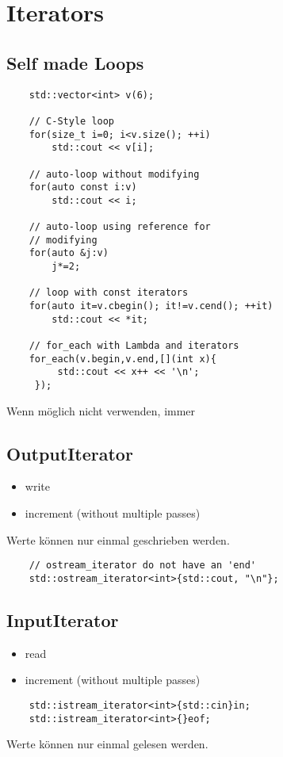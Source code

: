 \section{Iterators}
\subsection{Self made Loops}
\begin{lstlisting}
	std::vector<int> v(6);
	
	// C-Style loop
	for(size_t i=0; i<v.size(); ++i)
		std::cout << v[i];
	
	// auto-loop without modifying
	for(auto const i:v)
		std::cout << i;
	
	// auto-loop using reference for 
	// modifying
	for(auto &j:v)
		j*=2;

	// loop with const iterators
	for(auto it=v.cbegin(); it!=v.cend(); ++it)
		std::cout << *it;
		
	// for_each with Lambda and iterators
	for_each(v.begin,v.end,[](int x){
		 std::cout << x++ << '\n';
	 });
\end{lstlisting}
Wenn möglich nicht verwenden, immer 


\subsection{OutputIterator}
\begin{itemize}
	\item write
	\item increment (without multiple passes)
\end{itemize}
Werte können nur einmal geschrieben werden.
\begin{lstlisting}
	// ostream_iterator do not have an 'end'
	std::ostream_iterator<int>{std::cout, "\n"};
\end{lstlisting}

\subsection{InputIterator}
\begin{itemize}
	\item read
	\item increment (without multiple passes) 
\end{itemize}
\begin{lstlisting}
	std::istream_iterator<int>{std::cin}in;
	std::istream_iterator<int>{}eof;
\end{lstlisting}
Werte können nur einmal gelesen werden.

